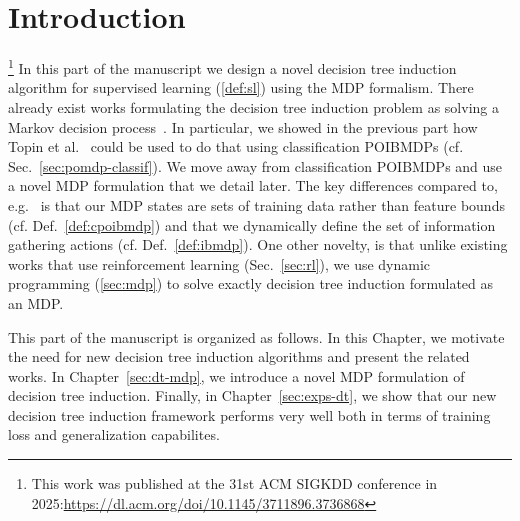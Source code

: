 \chapter{Introduction}\label{sec:part2}\footnote{This work was published at the 31st ACM SIGKDD conference in 2025:\url{https://dl.acm.org/doi/10.1145/3711896.3736868}}
In this part of the manuscript we design a novel decision tree induction algorithm for supervised learning (\ref{def:sl}) using the MDP formalism.
There already exist works formulating the decision tree induction problem as solving a Markov decision process~\cite{Dulac_Arnold_2011,garlapati2015reinforcementlearningapproachonline,topin2021iterative,chaouki2024branchesfastdynamicprogramming}.
In particular, we showed in the previous part how Topin et al.~\cite{topin2021iterative} could be used to do that using classification POIBMDPs (cf. Sec.~\ref{sec:pomdp-classif}).
We move away from classification POIBMDPs and use a novel MDP formulation that we detail later.
The key differences compared to, e.g.~\cite{topin2021iterative} is that our MDP states are sets of training data rather than feature bounds (cf. Def.~\ref{def:cpoibmdp}) and that we dynamically define the set of information gathering actions (cf. Def.~\ref{def:ibmdp}).
One other novelty, is that unlike existing works that use reinforcement learning (Sec.~\ref{sec:rl}), we use dynamic programming (\ref{sec:mdp}) to solve exactly decision tree induction formulated as an MDP.

This part of the manuscript is organized as follows.
In this Chapter, we motivate the need for new decision tree induction algorithms and present the related works.
In Chapter~\ref{sec:dt-mdp}, we introduce a novel MDP formulation of decision tree induction.
Finally, in Chapter~\ref{sec:exps-dt}, we show that our new decision tree induction framework performs very well both in terms of training loss and generalization capabilites.

